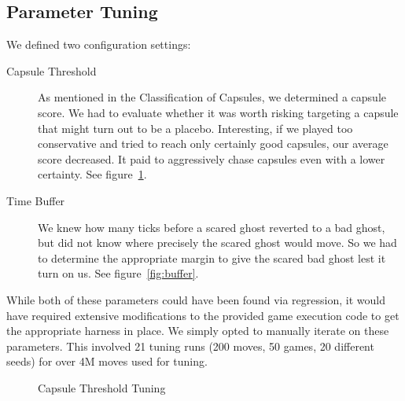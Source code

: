 \documentclass[11pt, oneside]{article}   	%
\begin{document}
\subsection{Parameter Tuning}
We defined two configuration settings:
\begin{description}
	\item[Capsule Threshold]As mentioned in the Classification of Capsules, we determined a capsule score. We had to evaluate whether it was worth risking targeting a capsule that might turn out to be a placebo. Interesting, if we played too conservative and tried to reach only certainly good capsules, our average score decreased. It paid to aggressively chase capsules even with a lower certainty. See figure~\ref{fig:threshold}.
	\item[Time Buffer]We knew how many ticks before a scared ghost reverted to a bad ghost, but did not know where precisely the scared ghost would move. So we had to determine the appropriate margin to give the scared bad ghost lest it turn on us. See figure~\ref{fig:buffer}.
\end{description}
While both of these parameters could have been found via regression, it would have required extensive modifications to the provided game execution code to get the appropriate harness in place. We simply opted to manually iterate on these parameters. This involved 21 tuning runs (200 moves, 50 games, 20 different seeds) for over 4M moves used for tuning.
\begin{figure}[h!]
  \centering
  \caption{Capsule Threshold Tuning}
  \label{fig:threshold}
 \end{figure}
\end{document}
